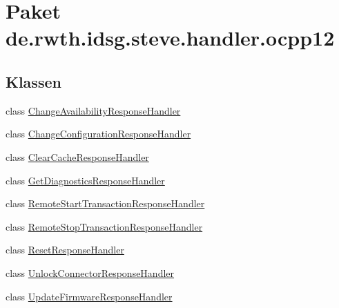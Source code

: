 \hypertarget{namespacede_1_1rwth_1_1idsg_1_1steve_1_1handler_1_1ocpp12}{\section{Paket de.\-rwth.\-idsg.\-steve.\-handler.\-ocpp12}
\label{namespacede_1_1rwth_1_1idsg_1_1steve_1_1handler_1_1ocpp12}
}
\subsection*{Klassen}
\begin{DoxyCompactItemize}
\item 
class \hyperlink{classde_1_1rwth_1_1idsg_1_1steve_1_1handler_1_1ocpp12_1_1_change_availability_response_handler}{Change\-Availability\-Response\-Handler}
\item 
class \hyperlink{classde_1_1rwth_1_1idsg_1_1steve_1_1handler_1_1ocpp12_1_1_change_configuration_response_handler}{Change\-Configuration\-Response\-Handler}
\item 
class \hyperlink{classde_1_1rwth_1_1idsg_1_1steve_1_1handler_1_1ocpp12_1_1_clear_cache_response_handler}{Clear\-Cache\-Response\-Handler}
\item 
class \hyperlink{classde_1_1rwth_1_1idsg_1_1steve_1_1handler_1_1ocpp12_1_1_get_diagnostics_response_handler}{Get\-Diagnostics\-Response\-Handler}
\item 
class \hyperlink{classde_1_1rwth_1_1idsg_1_1steve_1_1handler_1_1ocpp12_1_1_remote_start_transaction_response_handler}{Remote\-Start\-Transaction\-Response\-Handler}
\item 
class \hyperlink{classde_1_1rwth_1_1idsg_1_1steve_1_1handler_1_1ocpp12_1_1_remote_stop_transaction_response_handler}{Remote\-Stop\-Transaction\-Response\-Handler}
\item 
class \hyperlink{classde_1_1rwth_1_1idsg_1_1steve_1_1handler_1_1ocpp12_1_1_reset_response_handler}{Reset\-Response\-Handler}
\item 
class \hyperlink{classde_1_1rwth_1_1idsg_1_1steve_1_1handler_1_1ocpp12_1_1_unlock_connector_response_handler}{Unlock\-Connector\-Response\-Handler}
\item 
class \hyperlink{classde_1_1rwth_1_1idsg_1_1steve_1_1handler_1_1ocpp12_1_1_update_firmware_response_handler}{Update\-Firmware\-Response\-Handler}
\end{DoxyCompactItemize}
